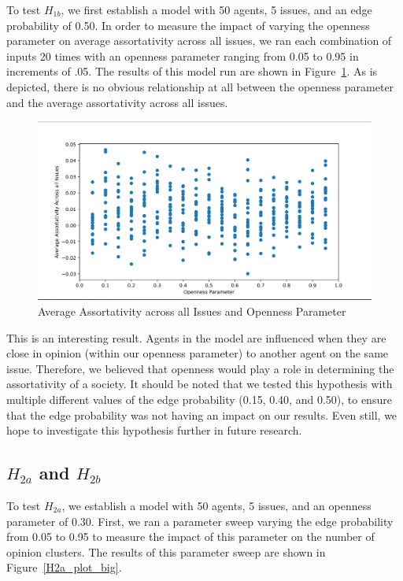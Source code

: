 To test $H_{1b}$, we first establish a model with 50 agents, 5 issues, and an
edge probability of 0.50. In order to measure the impact of varying the
openness parameter on average assortativity across all issues, we ran each
combination of inputs 20 times with an openness parameter ranging from 0.05 to
0.95 in increments of .05. The results of this model run are shown in
Figure~\ref{H1b_plot}. As is depicted, there is no obvious relationship at all
between the openness parameter and the average assortativity across all issues. 

\begin{figure}
\centering
\includegraphics[width=1.0\columnwidth]{./Graphs/Assort_openness.png}
\caption{Average Assortativity across all Issues and Openness Parameter}
\label{H1b_plot}
\end{figure}

This is an interesting result. Agents in the model are influenced when they are
close in opinion (within our openness parameter) to another agent on the same
issue. Therefore, we believed that openness would play a role in determining the assortativity of a society. 
It should be noted that we tested this hypothesis with multiple different values of the edge probability (0.15,
0.40, and 0.50), to ensure that the edge probability was not having an impact
on our results. Even still, we hope to investigate this hypothesis further in future research. 

\subsection{$H_{2a}$ and $H_{2b}$}

To test $H_{2a}$, we establish a model with 50 agents, 5 issues, and an
openness parameter of 0.30. First, we ran a parameter sweep varying the edge
probability from 0.05 to 0.95 to measure the impact of this parameter on the
number of opinion clusters. The results of this parameter sweep are shown in
Figure~\ref{H2a_plot_big}.

